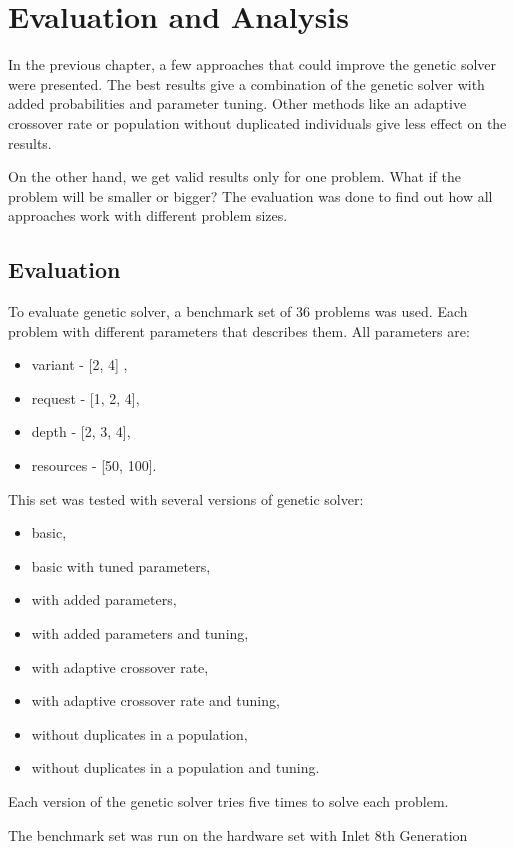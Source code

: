 \chapter{Evaluation and Analysis}

In the previous chapter, a few approaches that could improve the genetic solver were presented.
The best results give a combination of the genetic solver with added probabilities and parameter tuning.
Other methods like an adaptive crossover rate or population without duplicated individuals give less effect on the results.

On the other hand, we get valid results only for one problem. What if the problem will be smaller or bigger?
The evaluation was done to find out how all approaches work with different problem sizes. 
\section{Evaluation}
To evaluate genetic solver, a benchmark set of 36 problems was used.
Each problem with different parameters that describes them.
All parameters are:
\begin{itemize}
	\item variant - [2, 4] ,
	\item request - [1, 2, 4],
	\item depth - [2, 3, 4],
	\item resources - [50, 100].
\end{itemize}

This set was tested with several versions of genetic solver:
\begin{itemize}
	\item basic,
	\item basic with tuned parameters,
	\item with added parameters,
	\item with added parameters and tuning,
	\item with adaptive crossover rate,
	\item with adaptive crossover rate and tuning,
	\item without duplicates in a population,
	\item without duplicates in a population and tuning.
\end{itemize}

Each version of the genetic solver tries five times to solve each problem.

The benchmark set was run on the hardware set with Inlet 8th Generation 

